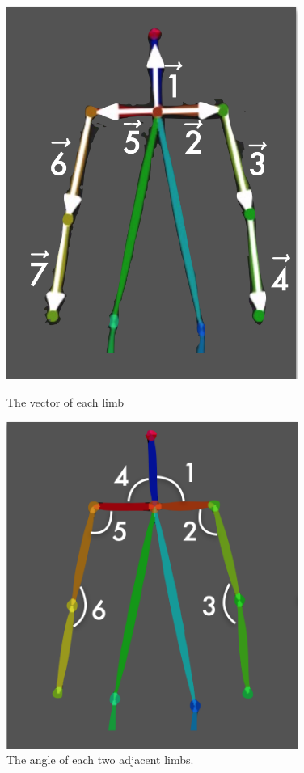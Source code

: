 \begin{figure}[!htbp]
\centering
\begin{minipage}[t]{0.45\textwidth}
\centering
\includegraphics[width=0.85\textwidth]{./img/limbvector.png}
\caption{The vector of each limb}
\label{fig:limbvector}
\end{minipage}
\begin{minipage}[t]{0.51\textwidth}
\centering
\includegraphics[width=0.85\textwidth]{./img/limbangle.png}
\caption{The angle of each two adjacent limbs.}
\label{fig:limbangle}
\end{minipage}
\end{figure}

